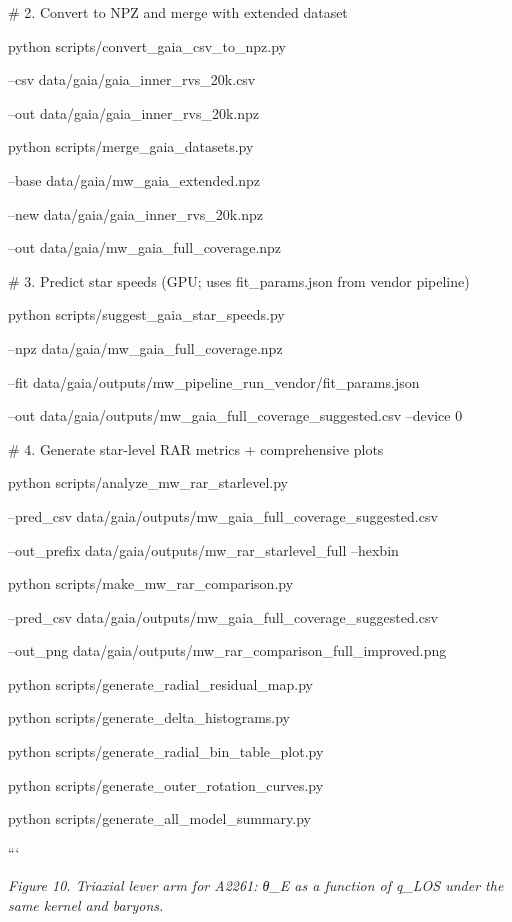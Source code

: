 \documentclass[11pt,a4paper]{article}
\begin{document}
\# 2. Convert to NPZ and merge with extended dataset

python scripts/convert\_gaia\_csv\_to\_npz.py \

  --csv data/gaia/gaia\_inner\_rvs\_20k.csv \

  --out data/gaia/gaia\_inner\_rvs\_20k.npz


python scripts/merge\_gaia\_datasets.py \

  --base data/gaia/mw\_gaia\_extended.npz \

  --new data/gaia/gaia\_inner\_rvs\_20k.npz \

  --out data/gaia/mw\_gaia\_full\_coverage.npz


\# 3. Predict star speeds (GPU; uses fit\_params.json from vendor pipeline)

python scripts/suggest\_gaia\_star\_speeds.py \

  --npz data/gaia/mw\_gaia\_full\_coverage.npz \

  --fit data/gaia/outputs/mw\_pipeline\_run\_vendor/fit\_params.json \

  --out data/gaia/outputs/mw\_gaia\_full\_coverage\_suggested.csv --device 0


\# 4. Generate star-level RAR metrics + comprehensive plots

python scripts/analyze\_mw\_rar\_starlevel.py \

  --pred\_csv data/gaia/outputs/mw\_gaia\_full\_coverage\_suggested.csv \

  --out\_prefix data/gaia/outputs/mw\_rar\_starlevel\_full --hexbin


python scripts/make\_mw\_rar\_comparison.py \

  --pred\_csv data/gaia/outputs/mw\_gaia\_full\_coverage\_suggested.csv \

  --out\_png data/gaia/outputs/mw\_rar\_comparison\_full\_improved.png


python scripts/generate\_radial\_residual\_map.py

python scripts/generate\_delta\_histograms.py

python scripts/generate\_radial\_bin\_table\_plot.py

python scripts/generate\_outer\_rotation\_curves.py

python scripts/generate\_all\_model\_summary.py

```


\textit{Figure 10. Triaxial lever arm for A2261: θ\_E as a function of q\_LOS under the same kernel and baryons.}
\end{document}
